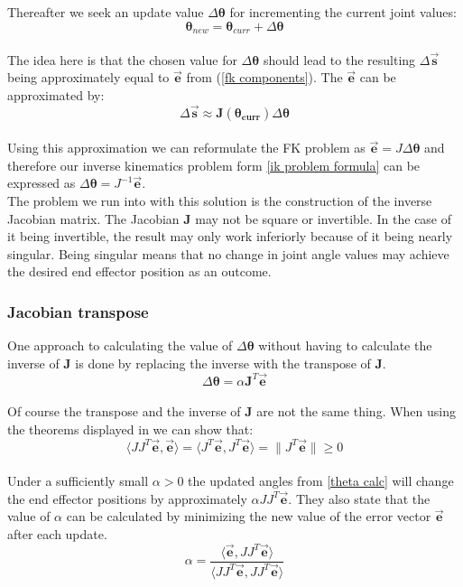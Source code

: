 Thereafter we seek an update value $\Delta\pmb{\theta}$ for incrementing the current joint values:\\
\begin{equation}
\label{theta calc}
\pmb{\theta}_{new}=\pmb{\theta}_{curr}+\Delta\pmb{\theta}
\end{equation}
\\The idea here is that the  chosen value for $\Delta\pmb{\theta}$ should lead to the resulting $\Delta\pmb{\vec{s}}$ being approximately equal to $\vec{\textbf{e}}$ from (\ref{fk components}). The $\vec{\textbf{e}}$ can be approximated by:\\
\begin{equation}
\label{delta s approx}
\Delta\pmb{\vec{s}}\approx \pmb{J(\theta_{curr})}\Delta\pmb{\theta}
\end{equation}
\\Using this approximation  we can reformulate the FK problem as $\pmb{}\vec{\pmb{e}}=J\Delta\pmb{\theta}$ and therefore our inverse kinematics problem form \ref{ik problem formula} can be expressed as $ \Delta\pmb{\theta}=J^{-1}\vec{\pmb{e}}$. \\The problem we run into with this solution is the construction of the inverse Jacobian matrix. The Jacobian \textbf{J} may not be square or invertible. In the case of it being invertible, the result may only work inferiorly because of it being nearly singular. Being singular means that no change in joint angle values may achieve the desired end effector position as an outcome.
\subsubsection{Jacobian transpose}
One approach to calculating the value of $\Delta\pmb{\theta}$ without having to calculate the inverse of \textbf{J} is done by replacing the inverse with the transpose of \textbf{J}.\\
\begin{equation}
\label{delta theta transpose}
\Delta\pmb{\theta}=\alpha \pmb{J}^{T}\vec{\pmb{e}}
\end{equation}
\\Of course the transpose and the inverse of \textbf{J} are not the same thing. When using the theorems displayed in \cite{Orin.1984,Wolovich.1984} we can show that:\\ 
\begin{equation}
\label{transpose show}
\langle JJ^{T}\vec{\pmb{e}},\vec{\pmb{e}}\rangle=\langle J^{T}\vec{\pmb{e}},J^{T}\vec{\pmb{e}}\rangle=\|J^{T}\vec{\pmb{e}}\|\geq 0
\end{equation}
\\Under a sufficiently small $\alpha>0$ the updated angles from \ref{theta calc} will change the end effector positions by approximately $\alpha JJ^{T}\vec{\pmb{e}}$. They also state that 
the value of $\alpha$ can be calculated by minimizing the new value of the error vector $\vec{\pmb{e}}$ after each update.\\
\begin{equation}
\label{transpose alpha}
\alpha=\frac{\langle\vec{\pmb{e}},JJ^{T}\vec{\pmb{e}}\rangle}{\langle JJ^{T}\vec{\pmb{e}},JJ^{T}\vec{\pmb{e}}\rangle}
\end{equation}
